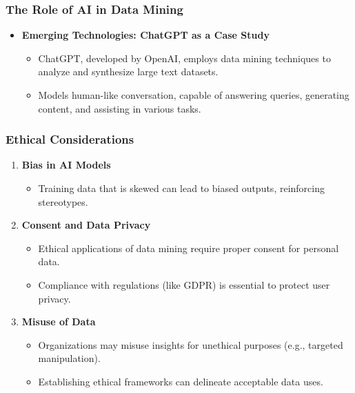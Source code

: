 \documentclass[aspectratio=169]{beamer}
\begin{document}
\begin{frame}[fragile]
    \frametitle{The Role of AI in Data Mining}
    \begin{itemize}
        \item \textbf{Emerging Technologies: ChatGPT as a Case Study}
        \begin{itemize}
            \item ChatGPT, developed by OpenAI, employs data mining techniques to analyze and synthesize large text datasets.
            \item Models human-like conversation, capable of answering queries, generating content, and assisting in various tasks.
        \end{itemize}
    \end{itemize}
\end{frame}

\begin{frame}[fragile]
    \frametitle{Ethical Considerations}
    \begin{enumerate}
        \item \textbf{Bias in AI Models}
        \begin{itemize}
            \item Training data that is skewed can lead to biased outputs, reinforcing stereotypes.
        \end{itemize}

        \item \textbf{Consent and Data Privacy}
        \begin{itemize}
            \item Ethical applications of data mining require proper consent for personal data.
            \item Compliance with regulations (like GDPR) is essential to protect user privacy.
        \end{itemize}

        \item \textbf{Misuse of Data}
        \begin{itemize}
            \item Organizations may misuse insights for unethical purposes (e.g., targeted manipulation).
            \item Establishing ethical frameworks can delineate acceptable data uses.
        \end{itemize}
    \end{enumerate}
\end{frame}
\end{document}
